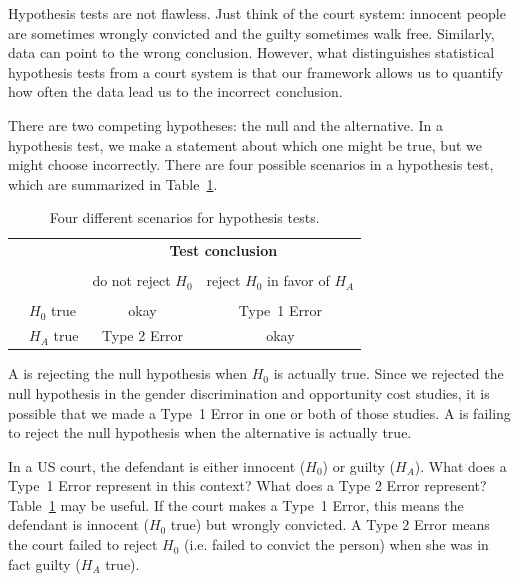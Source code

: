 
Hypothesis tests are not flawless. Just think of the court system: innocent people are sometimes wrongly convicted and the guilty sometimes walk free. Similarly, data can point to the wrong conclusion. However, what distinguishes statistical hypothesis tests from a court system is that our framework allows us to quantify how often the data lead us to the incorrect conclusion.

There are two competing hypotheses: the null and the alternative. In a hypothesis test, we make a statement about which one might be true, but we might choose incorrectly. There are four possible scenarios in a hypothesis test, which are summarized in Table~\ref{fourHTScenarios}.

\begin{table}[ht]
\centering
\begin{tabular}{l l c c}
& & \multicolumn{2}{c}{\textbf{Test conclusion}} \\
  \cline{3-4}
\vspace{-3.7mm} \\
& & do not reject $H_0$ &  reject $H_0$ in favor of $H_A$ \\
  \cline{2-4}
\vspace{-3.7mm} \\
& $H_0$ true & okay &  Type~1 Error \\
\raisebox{1.5ex}{\textbf{Truth}} & $H_A$ true & Type 2 Error & okay \\
  \cline{2-4}
\end{tabular}
\caption{Four different scenarios for hypothesis tests.}
\label{fourHTScenarios}
\end{table}

A  is rejecting the null hypothesis when $H_0$ is actually true. Since we rejected the null hypothesis in the gender discrimination and opportunity cost studies, it is possible that we made a Type~1 Error in one or both of those studies. A  is failing to reject the null hypothesis when the alternative is actually true.

\begin{example}{In a US court, the defendant is either innocent ($H_0$) or  guilty ($H_A$). What does a Type~1 Error represent in this context? What does a Type 2 Error represent? Table~\ref{fourHTScenarios} may be useful.}
If the court makes a Type~1 Error, this means the defendant is innocent ($H_0$ true) but wrongly convicted. A Type 2 Error means the court failed to reject $H_0$ (i.e. failed to convict the person) when she was in fact guilty ($H_A$ true).
\end{example}

